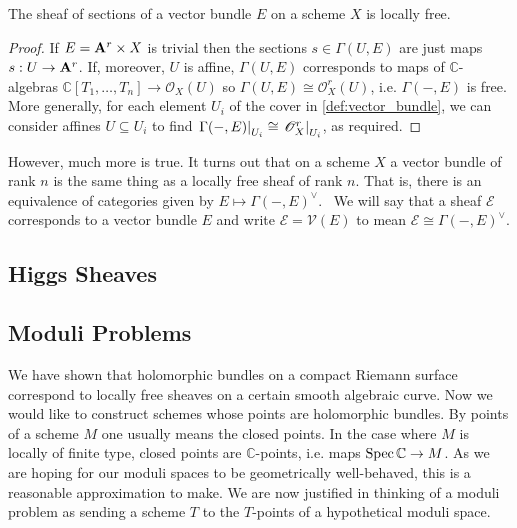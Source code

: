 \documentclass[12pt]{ociamthesis}  %
\begin{document}
\begin{lemma}
  The sheaf of sections of a vector bundle $E$ on a scheme $X$ is
  locally free.
  \begin{proof}
    If $E=\mathbf{A}^{r}_{}\times X$ is
    trivial then the sections $s\in\Gamma(U,E)$ are just maps
    $s:U\to \mathbf{A}^{r}_{}$. If, moreover, $U$ is affine,
    $\Gamma(U,E)$ corresponds to maps of
    $\mathbb{C}$-algebras
    $\mathbb{C}[T_1,\ldots,T_n]\to\mathscr O_X(U)$ so
    $\Gamma(U,E)\cong \mathscr O^r_X(U)$, i.e. $\Gamma(-,E)$
    is free.
    More generally, for each element $U_i$ of the cover in
    \ref{def:vector_bundle}, we can consider affines $U\subseteq U_i$
    to find $\left.{\Gamma(-,E)}\right\vert_{U_i}\cong \left.{\mathscr O_X^r}\right\vert_{U_i}$,
    as required.
  \end{proof}
\end{lemma}

However, much more is true. It turns out that on a scheme $X$
a vector bundle of rank $n$ is the same thing as a locally
free sheaf of rank $n$. That is, there is an equivalence
of categories given by $E \mapsto \Gamma(-,E)^\vee$.~\cite[128-129]{hartshorne1977}
We will say that a sheaf $\mathscr E$ corresponds to a vector bundle
$E$ and write $\mathscr E=\mathcal V(E)$ to mean
$\mathscr E\cong\Gamma(-,E)^\vee$.

\subsection{Higgs Sheaves}

\missingsection

\subsection{Moduli Problems}

We have shown that holomorphic bundles on a compact Riemann surface
correspond to locally free sheaves on a certain smooth algebraic
curve. Now we would like to construct schemes whose points are
holomorphic bundles. By points of a scheme $M$ one usually means the
closed points. In the case where $M$ is locally of finite type,
closed points are $\mathbb{C}$-points, i.e. maps
$\operatorname{Spec}\mathbb{C}\to M$. \cite[Corollary 3.36]{gortz2010} As we
are hoping for our moduli spaces to be geometrically well-behaved,
this is a reasonable approximation to make. We are now justified in
thinking of a moduli problem as sending a scheme $T$ to the
$T$-points of a hypothetical moduli space.
\end{document}
